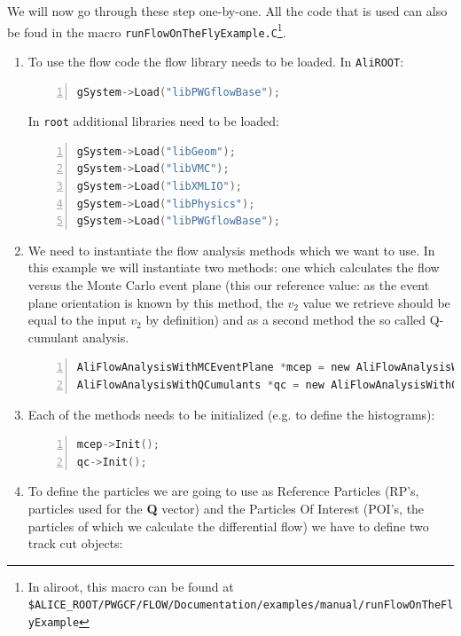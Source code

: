 \documentclass[a4paper]{book}
\numberwithin{equation}{subsection}
\begin{document}
We will now go through these step one-by-one. All the code that is used can also be foud in the macro \texttt{runFlowOnTheFlyExample.C}\footnote{In aliroot, this macro can be found at \\ \texttt{\$ALICE\_ROOT/PWGCF/FLOW/Documentation/examples/manual/runFlowOnTheFlyExample}}.
\begin{enumerate}
	\item To use the flow code the flow library needs to be loaded. In \texttt{AliROOT}:
	\begin{lstlisting}[language=C, numbers=left]
gSystem->Load("libPWGflowBase");\end{lstlisting}
	In \texttt{root} additional libraries need to be loaded: 
        \begin{lstlisting}[language=C, numbers=left]
gSystem->Load("libGeom");
gSystem->Load("libVMC");
gSystem->Load("libXMLIO");
gSystem->Load("libPhysics");
gSystem->Load("libPWGflowBase");\end{lstlisting}
	\item We need to instantiate the flow analysis methods which we want to use. In this example we will
            instantiate two methods: one which calculates the flow versus the Monte Carlo event plane (this our reference value: as the event plane orientation is known by this method, the $v_2$ value we retrieve should be equal to the input $v_2$ by definition) and as a second method the so called Q-cumulant analysis.
\begin{lstlisting}[language=C, numbers=left]
AliFlowAnalysisWithMCEventPlane *mcep = new AliFlowAnalysisWithMCEventPlane();
AliFlowAnalysisWithQCumulants *qc = new AliFlowAnalysisWithQCumulants();\end{lstlisting}
	\item Each of the methods needs to be initialized (e.g. to define the histograms): 
\begin{lstlisting}[language=C, numbers=left]
mcep->Init(); 
qc->Init();\end{lstlisting}
	\item To define the particles we are going to use as Reference Particles  (RP's, particles 
	used for the {\bf Q} vector) and the Particles Of Interest  (POI's, the particles of which we calculate the differential flow) we have to define two track cut objects:

\end{enumerate}
\end{document}
